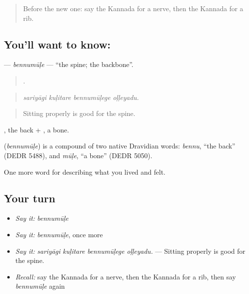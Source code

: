 \label{lesson:KA-C509-bennumule}



\begin{quote}
Before the new one: say the Kannada for a nerve, then the Kannada for a rib.
\end{quote}

\subsection*{You'll want to know: }
\textbf{} — \emph{bennumūḷe} — \textquotedblleft{}the spine; the backbone\textquotedblright{}.

\begin{quote}
   .
\end{quote}

\begin{quote}
\emph{sariyāgi kuḷitare bennumūḷege oḷḷeyadu.}
\end{quote}

\begin{quote}
Sitting properly is good for the spine.
\end{quote}

, the back + , a bone.

\begin{cousinweb}
\textbf{} (\emph{bennumūḷe}) is a compound of two native Dravidian words: \emph{bennu}, \textquotedblleft{}the back\textquotedblright{} (DEDR 5488), and \emph{mūḷe}, \textquotedblleft{}a bone\textquotedblright{} (DEDR 5050).
\end{cousinweb}

\begin{grammarlens}[title={What you've built}]
One more word for describing what you lived and felt.
\end{grammarlens}

\subsection*{Your turn}
\begin{itemize}
\raggedright
  \item \emph{Say it:} \emph{bennumūḷe}
  \item \emph{Say it:} \emph{bennumūḷe}, once more
  \item \emph{Say it:} \emph{sariyāgi kuḷitare bennumūḷege oḷḷeyadu.} — Sitting properly is good for the spine.
  \item \emph{Recall:} say the Kannada for a nerve, then the Kannada for a rib, then say \emph{bennumūḷe} again
\end{itemize}

